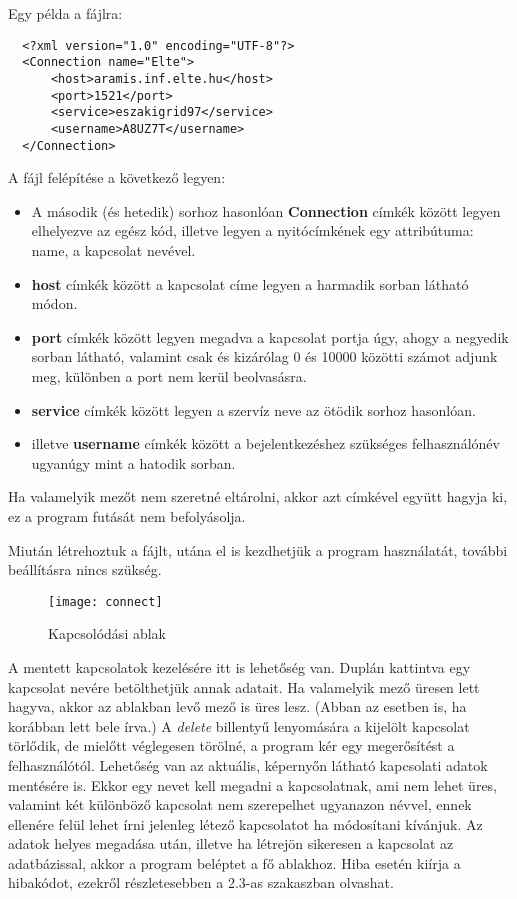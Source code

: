 Egy példa a fájlra:

\begin{lstlisting}
  <?xml version="1.0" encoding="UTF-8"?>
  <Connection name="Elte">
      <host>aramis.inf.elte.hu</host>
      <port>1521</port>
      <service>eszakigrid97</service>
      <username>A8UZ7T</username>
  </Connection>
\end{lstlisting}

A fájl felépítése a következő legyen:
\begin{itemize}
  \item A második (és hetedik) sorhoz hasonlóan \textbf{Connection} címkék között legyen elhelyezve az egész kód, illetve legyen a
  nyitócímkének egy attribútuma: name, a kapcsolat nevével.
  \item \textbf{host} címkék között a kapcsolat címe legyen a harmadik sorban látható módon.
  \item \textbf{port} címkék között legyen megadva a kapcsolat portja úgy, ahogy a negyedik sorban látható, valamint csak és kizárólag 0 és 10000 közötti számot adjunk meg, különben a
  port nem kerül beolvasásra.
  \item \textbf{service} címkék között legyen a szervíz neve az ötödik sorhoz hasonlóan.
  \item illetve \textbf{username} címkék között a bejelentkezéshez szükséges felhasználónév ugyanúgy mint a hatodik sorban.
\end{itemize}
Ha valamelyik mezőt nem szeretné eltárolni, akkor azt címkével együtt hagyja ki, ez a program futását nem befolyásolja.

Miután létrehoztuk a fájlt, utána el is kezdhetjük a program használatát, további beállításra nincs szükség.
\begin{figure}[ht]
  \begin{center}
  \texttt{[image: connect]}
  \end{center}
 \caption{Kapcsolódási ablak}
\end{figure}
A mentett kapcsolatok kezelésére itt is lehetőség van.
Duplán kattintva egy kapcsolat nevére betölthetjük annak adatait. Ha valamelyik mező üresen lett hagyva,
akkor az ablakban levő mező is üres lesz. (Abban az esetben is, ha korábban lett bele írva.)
A \textit{delete} billentyű lenyomására a kijelölt kapcsolat törlődik, de
mielőtt véglegesen törölné, a program kér egy megerősítést a felhasználótól.
Lehetőség van az aktuális, képernyőn látható kapcsolati adatok mentésére is. Ekkor egy nevet kell megadni a kapcsolatnak, ami nem lehet üres,
valamint két különböző kapcsolat nem szerepelhet ugyanazon névvel, ennek ellenére felül lehet írni jelenleg létező kapcsolatot ha módosítani
kívánjuk.
Az adatok helyes megadása után, illetve ha létrejön sikeresen a kapcsolat az adatbázissal, akkor a program beléptet a fő ablakhoz.
Hiba esetén kiírja a hibakódot, ezekről részletesebben a 2.3-as szakaszban olvashat.

